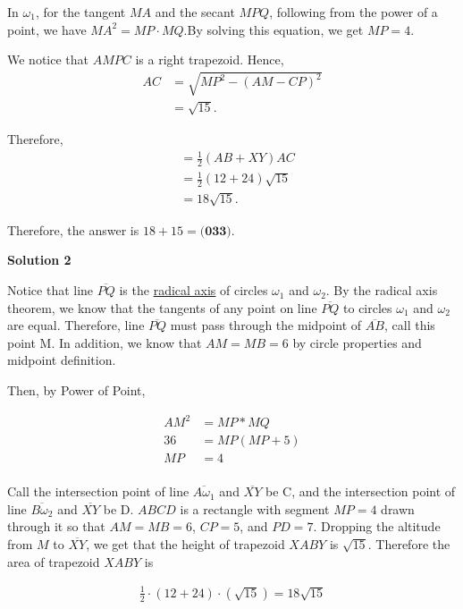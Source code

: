 \begin{enumerate}
 In $\omega_1$, for the tangent $MA$ and the secant $MPQ$, following from the power of a point, we have $MA^2 = MP \cdot MQ$.By solving this equation, we get $MP = 4$.

 We notice that $AMPC$ is a right trapezoid. Hence,
 \begin{align*} AC & = \sqrt{MP^2 - \left( AM - CP \right)^2} \\ & = \sqrt{15} . \end{align*}


 Therefore,
 \begin{align*} [XABY] & = \frac{1}{2} \left( AB + XY \right) AC \\ & = \frac{1}{2} \left( 12 + 24 \right) \sqrt{15} \\ & = 18 \sqrt{15}. \end{align*}


 Therefore, the answer is $18 + 15 = \boxed{\textbf{(033)}}$.

 



\textbf{Solution 2}

Notice that line $\overline{PQ}$ is the \href{https://artofproblemsolving.com/wiki/index.php?title=Radical\_axis}{radical axis} of circles $\omega_1$ and $\omega_2$. By the radical axis theorem, we know that the tangents of any point on line $\overline{PQ}$ to circles $\omega_1$ and $\omega_2$ are equal. Therefore, line $\overline{PQ}$ must pass through the midpoint of $\overline{AB}$, call this point M. In addition, we know that $AM=MB=6$ by circle properties and midpoint definition.

 Then, by Power of Point,

 
 \begin{align*} AM^2&=MP*MQ \\ 36&=MP(MP+5) \\ MP&=4 \\ \end{align*}


 Call the intersection point of line $\overline{A\omega_1}$ and $\overline{XY}$ be C, and the intersection point of line $\overline{B\omega_2}$ and $\overline{XY}$ be D. $ABCD$ is a rectangle with segment $MP=4$ drawn through it so that $AM=MB=6$, $CP=5$, and $PD=7$. Dropping the altitude from $M$ to $\overline{XY}$, we get that the height of trapezoid $XABY$ is $\sqrt{15}$. Therefore the area of trapezoid $XABY$ is

 
 \begin{align*} \frac{1}{2}\cdot(12+24)\cdot(\sqrt{15})=18\sqrt{15} \end{align*}



\end{enumerate}
